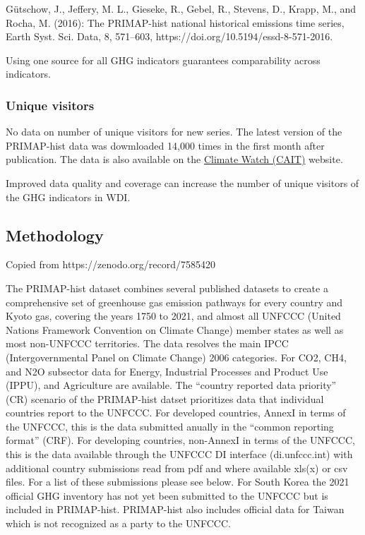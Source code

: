 \documentclass[
  letterpaper,
  DIV=11,
  numbers=noendperiod]{scrartcl}
\begin{document}
Gütschow, J., Jeffery, M. L., Gieseke, R., Gebel, R., Stevens, D.,
Krapp, M., and Rocha, M. (2016): The PRIMAP-hist national historical
emissions time series, Earth Syst. Sci. Data, 8, 571--603,
https://doi.org/10.5194/essd-8-571-2016.

Using one source for all GHG indicators guarantees comparability across
indicators.

\hypertarget{unique-visitors}{%
\subsubsection{Unique visitors}\label{unique-visitors}}

No data on number of unique visitors for new series. The latest version
of the PRIMAP-hist data was dowmloaded 14,000 times in the first month
after publication. The data is also available on the
\href{https://www.climatewatchdata.org/ghg-emissions}{Climate Watch
(CAIT)} website.

Improved data quality and coverage can increase the number of unique
visitors of the GHG indicators in WDI.

\hypertarget{methodology}{%
\subsection{Methodology}\label{methodology}}

Copied from https://zenodo.org/record/7585420

The PRIMAP-hist dataset combines several published datasets to create a
comprehensive set of greenhouse gas emission pathways for every country
and Kyoto gas, covering the years 1750 to 2021, and almost all UNFCCC
(United Nations Framework Convention on Climate Change) member states as
well as most non-UNFCCC territories. The data resolves the main IPCC
(Intergovernmental Panel on Climate Change) 2006 categories. For CO2,
CH4, and N2O subsector data for Energy, Industrial Processes and Product
Use (IPPU), and Agriculture are available. The ``country reported data
priority'' (CR) scenario of the PRIMAP-hist datset prioritizes data that
individual countries report to the UNFCCC. For developed countries,
AnnexI in terms of the UNFCCC, this is the data submitted anually in the
``common reporting format'' (CRF). For developing countries, non-AnnexI
in terms of the UNFCCC, this is the data available through the UNFCCC DI
interface (di.unfccc.int) with additional country submissions read from
pdf and where available xls(x) or csv files. For a list of these
submissions please see below. For South Korea the 2021 official GHG
inventory has not yet been submitted to the UNFCCC but is included in
PRIMAP-hist. PRIMAP-hist also includes official data for Taiwan which is
not recognized as a party to the UNFCCC.
\end{document}
